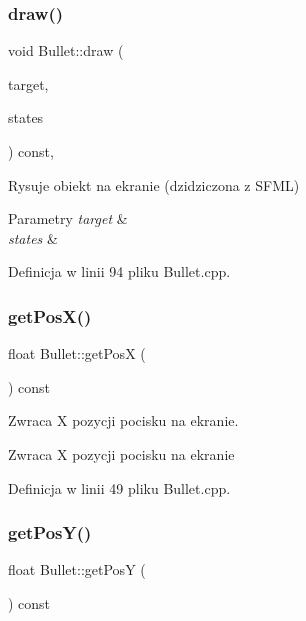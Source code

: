 \subsubsection{\texorpdfstring{draw()}{draw()}}
{\footnotesize\ttfamily void Bullet\+::draw (\begin{DoxyParamCaption}\item[{sf\+::\+Render\+Target \&}]{target,  }\item[{sf\+::\+Render\+States}]{states }\end{DoxyParamCaption}) const\hspace{0.3cm}{\ttfamily [override]}, {\ttfamily [protected]}}



Rysuje obiekt na ekranie (dzidziczona z S\+F\+ML) 


\begin{DoxyParams}{Parametry}
{\em target} & \\
\hline
{\em states} & \\
\hline
\end{DoxyParams}


Definicja w linii 94 pliku Bullet.\+cpp.

\mbox{\label{class_bullet_ab9d387e9b8149d347a63bc82cede9549}} 
\subsubsection{\texorpdfstring{get\+Pos\+X()}{getPosX()}}
{\footnotesize\ttfamily float Bullet\+::get\+PosX (\begin{DoxyParamCaption}{ }\end{DoxyParamCaption}) const}



Zwraca X pozycji pocisku na ekranie. 

\begin{DoxyReturn}{Zwraca}
X pozycji pocisku na ekranie 
\end{DoxyReturn}


Definicja w linii 49 pliku Bullet.\+cpp.

\mbox{\label{class_bullet_a06183fe0cba63d671a05fc8e19102966}} 
\subsubsection{\texorpdfstring{get\+Pos\+Y()}{getPosY()}}
{\footnotesize\ttfamily float Bullet\+::get\+PosY (\begin{DoxyParamCaption}{ }\end{DoxyParamCaption}) const}



